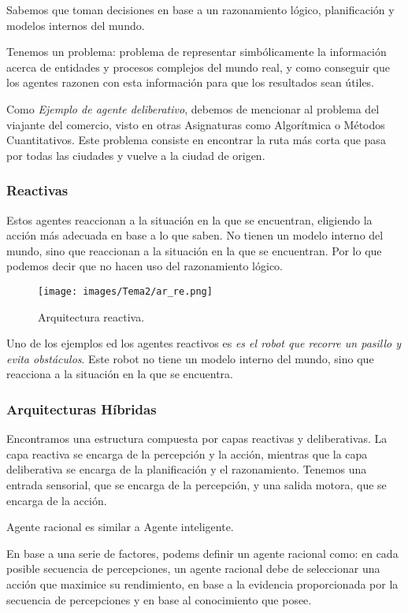 Sabemos que toman decisiones en base a un razonamiento lógico, planificación y modelos internos del mundo.

Tenemos un problema: problema de representar simbólicamente la
información acerca de entidades y procesos
complejos del mundo real, y como conseguir que los
agentes razonen con esta información para que los
resultados sean útiles.

Como \textit{Ejemplo de agente deliberativo}, debemos de mencionar al problema del viajante del comercio, visto en otras Asignaturas como Algorítmica o Métodos Cuantitativos.
Este problema consiste en encontrar la ruta más corta que pasa por todas las ciudades y vuelve a la ciudad de origen.

\subsubsection{Reactivas}

Estos agentes reaccionan a la situación en la que se encuentran, eligiendo la acción más adecuada en base a lo que saben. No tienen un modelo interno del mundo, sino que reaccionan a la situación en la que se encuentran. Por lo que podemos decir que no hacen uso del razonamiento lógico.

\begin{figure}[H]
    \centering
    \texttt{[image: images/Tema2/ar\_re.png]}
    \caption{Arquitectura reactiva.}
    \label{fig:reactivo}
\end{figure}

Uno de los ejemplos ed los agentes reactivos es \textit{es el robot que recorre un pasillo y evita obstáculos}. Este robot no tiene un modelo interno del mundo, sino que reacciona a la situación en la que se encuentra.

\subsubsection{Arquitecturas Híbridas}

Encontramos una estructura compuesta por capas reactivas y deliberativas. La capa reactiva se encarga de la percepción y la acción, mientras que la capa deliberativa se encarga de la planificación y el razonamiento. Tenemos una entrada sensorial, que se encarga de la percepción, y una salida motora, que se encarga de la acción.

Agente racional es similar a Agente inteligente.

En base a una serie de factores, podems definir un agente racional como: en cada posible secuencia de percepciones, un agente racional debe de seleccionar una acción que maximice su rendimiento, en base a la evidencia proporcionada por la secuencia de percepciones y en base al conocimiento que posee.

